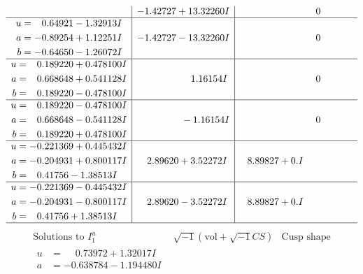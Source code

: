 \documentclass[1p]{elsarticle_modified}
\theoremstyle{definition}
\newcommand{\I}{\sqrt{-1}}
\begin{document}
$$\begin{array}{c|c|c}
 & -1.42727 + 13.32260 I & \phantom{-0.000000 } 0 \\ \hline\begin{aligned}
u &= \phantom{-}0.64921 - 1.32913 I \\
a &= -0.89254 + 1.12251 I \\
b &= -0.64650 - 1.26072 I\end{aligned}
 & -1.42727 - 13.32260 I & \phantom{-0.000000 } 0 \\ \hline\begin{aligned}
u &= \phantom{-}0.189220 + 0.478100 I \\
a &= \phantom{-}0.668648 + 0.541128 I \\
b &= \phantom{-}0.189220 - 0.478100 I\end{aligned}
 & \phantom{-0.000000 -}1.16154 I & \phantom{-0.000000 } 0 \\ \hline\begin{aligned}
u &= \phantom{-}0.189220 - 0.478100 I \\
a &= \phantom{-}0.668648 - 0.541128 I \\
b &= \phantom{-}0.189220 + 0.478100 I\end{aligned}
 & \phantom{-0.000000 } -1.16154 I & \phantom{-0.000000 } 0 \\ \hline\begin{aligned}
u &= -0.221369 + 0.445432 I \\
a &= -0.204931 + 0.800117 I \\
b &= \phantom{-}0.41756 - 1.38513 I\end{aligned}
 & \phantom{-}2.89620 + 3.52272 I & \phantom{-}8.89827 + 0. I\phantom{ +0.000000I} \\ \hline\begin{aligned}
u &= -0.221369 - 0.445432 I \\
a &= -0.204931 - 0.800117 I \\
b &= \phantom{-}0.41756 + 1.38513 I\end{aligned}
 & \phantom{-}2.89620 - 3.52272 I & \phantom{-}8.89827 + 0. I\phantom{ +0.000000I}\\
 \hline 
 \end{array}$$\newpage$$\begin{array}{c|c|c}  
\text{Solutions to }I^u_{1}& \I (\text{vol} + \sqrt{-1}CS) & \text{Cusp shape}\\
 \hline 
\begin{aligned}
u &= \phantom{-}0.73972 + 1.32017 I \\
a &= -0.638784 - 1.194480 I \\

\end{aligned}
\end{array}$$
\end{document}

